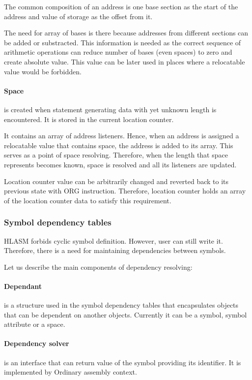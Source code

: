 The common composition of an address is one base section as the start of the address and value of storage as the offset from it.

The need for array of bases is there because addresses from different sections can be added or substracted. This information is needed as the correct sequence of arithmetic operations can reduce number of bases (even spaces) to zero and create absolute value. This value can be later used in places where a relocatable value would be forbidden.

\paragraph*{Space} is created when statement generating data with yet unknown length is encountered. It is stored in the current location counter. 

It contains an array of address listeners. Hence, when an address is assigned a relocatable value that contains space, the address is added to its array. This serves as a point of space resolving. Therefore, when the length that space represents becomes known, space is resolved and all its listeners are updated.

\vspace{0.5cm}

Location counter value can be arbitrarily changed and reverted back to its previous state with ORG instruction. Therefore, location counter holds an array of the location counter data to satisfy this requirement.

\subsubsection{Symbol dependency tables}

HLASM forbids cyclic symbol definition. However, user can still write it. Therefore, there is a need for maintaining dependencies between symbols.

Let us describe the main components of dependency resolving:

\paragraph*{Dependant} is a structure used in the symbol dependency tables that encapsulates objects that can be dependent on another objects. Currently it can be a symbol, symbol attribute or a space.

\paragraph*{Dependency solver} is an interface that can return value of the symbol providing its identifier. It is implemented by Ordinary assembly context.

